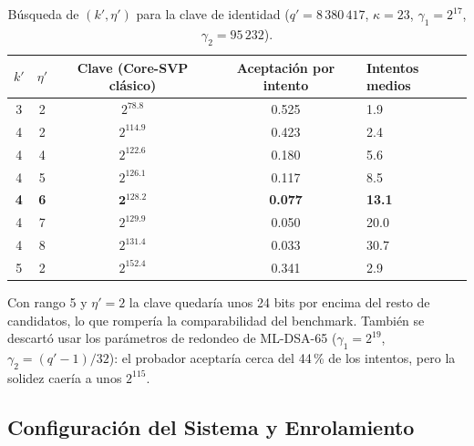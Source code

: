 \begin{table}[H]
\centering
\caption{Búsqueda de $(k', \eta')$ para la clave de identidad ($q' = 8\,380\,417$, $\kappa = 23$, $\gamma_1 = 2^{17}$, $\gamma_2 = 95\,232$).}
\label{tab:pqlite_busqueda}
\small
\begin{tabular}{ccccl}
\toprule
$k'$ & $\eta'$ & \textbf{Clave (Core-SVP clásico)} & \textbf{Aceptación por intento} & \textbf{Intentos medios} \\
\midrule
3 & 2 & $2^{78.8}$ & 0.525 & 1.9 \\
4 & 2 & $2^{114.9}$ & 0.423 & 2.4 \\
4 & 4 & $2^{122.6}$ & 0.180 & 5.6 \\
4 & 5 & $2^{126.1}$ & 0.117 & 8.5 \\
\textbf{4} & \textbf{6} & $\mathbf{2^{128.2}}$ & \textbf{0.077} & \textbf{13.1} \\
4 & 7 & $2^{129.9}$ & 0.050 & 20.0 \\
4 & 8 & $2^{131.4}$ & 0.033 & 30.7 \\
5 & 2 & $2^{152.4}$ & 0.341 & 2.9 \\
\bottomrule
\end{tabular}
\end{table}

Con rango 5 y $\eta' = 2$ la clave quedaría unos 24 bits por encima del resto de candidatos, lo que rompería la comparabilidad del benchmark. También se descartó usar los parámetros de redondeo de ML-DSA-65 ($\gamma_1 = 2^{19}$, $\gamma_2 = (q'-1)/32$): el probador aceptaría cerca del 44\,\% de los intentos, pero la solidez caería a unos $2^{115}$.

\subsection{Configuración del Sistema y Enrolamiento}
\label{sec:pqlite-setup}

